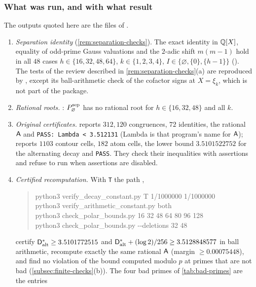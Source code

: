 \subsubsection*{What was run, and with what result}
The outputs quoted here are the files of .
\begin{enumerate}[(1)]
  \item \emph{Separation identity} (\cref{rem:separation-checks}). The exact identity in $\mathbb{Q}[X]$,
  equality of odd-prime Gauss valuations and the $2$-adic shift $m(m-1)$ hold in all $48$ cases
  $h\in\{16,32,48,64\}$, $k\in\{1,2,3,4\}$, $I\in\{\varnothing,\{0\},\{h-1\}\}$
  (). The tests of the review described in
  \cref{rem:separation-checks}(a) are reproduced by , except its
  ball-arithmetic check of the cofactor signs at $X=\xi_k$, which is not part of the package.
  \item \emph{Rational roots.} : $P^{\mathrm{sep}}_\varnothing$ has no
  rational root for $h\in\{16,32,48\}$ and all $k$.
  \item \emph{Original certificates.}  reports $312{,}120$
  congruences, $72$ identities, the rational $\mathsf{A}$ and \texttt{PASS: Lambda < 3.512131} (Lambda is
  that program's name for $\mathsf{A}$);  reports $1103$ contour cells,
  $182$ atom cells, the lower bound $3.5101522752$ for the alternating decay and \texttt{PASS}.
  They check their inequalities with assertions and refuse to run when assertions are disabled.
  \item \emph{Certified recomputation.} With \texttt{T} the path
  ,
  \begin{quote}\small\ttfamily
  python3 verify\_decay\_constant.py T 1/1000000 1/1000000\\
  python3 verify\_arithmetic\_constant.py both\\
  python3 check\_polar\_bounds.py 16 32 48 64 80 96 128\\
  python3 check\_polar\_bounds.py -{}-deletions 32 48
  \end{quote}
  certify $\mathsf{D}^{*}_{\mathrm{alt}}\ge3.5101772515$ and $\mathsf{D}^{*}_{\mathrm{alt}}+(\log2)/256\ge3.5128848577$ in ball
  arithmetic, recompute exactly the same rational $\mathsf{A}$ (margin $\ge0.00075448$), and find no
  violation of the bound computed modulo $p$ at primes that are not bad
  (\cref{subsec:finite-checks}(b)). The four bad primes of \cref{tab:bad-primes} are the entries

\end{enumerate}
